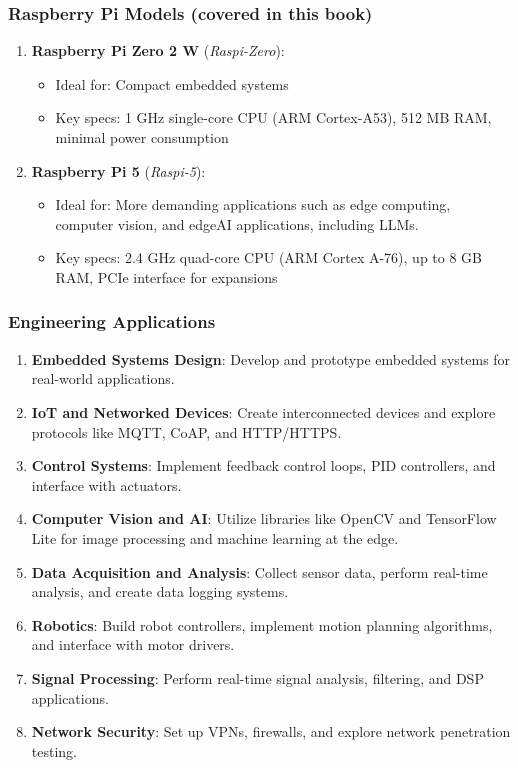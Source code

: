 \documentclass[
]{article}
\providecommand{\tightlist}{%
  \setlength{\itemsep}{0pt}\setlength{\parskip}{0pt}}\usepackage{longtable,booktabs,array}
\begin{document}
\subsubsection{Raspberry Pi Models (covered in this
book)}\label{sec-setup-raspberry-pi-models-covered-book-1942}

\begin{enumerate}
\def\labelenumi{\arabic{enumi}.}
\tightlist
\item
  \textbf{Raspberry Pi Zero 2 W} (\emph{Raspi-Zero}):

  \begin{itemize}
  \tightlist
  \item
    Ideal for: Compact embedded systems
  \item
    Key specs: 1 GHz single-core CPU (ARM Cortex-A53), 512 MB RAM,
    minimal power consumption
  \end{itemize}
\item
  \textbf{Raspberry Pi 5} (\emph{Raspi-5}):

  \begin{itemize}
  \tightlist
  \item
    Ideal for: More demanding applications such as edge computing,
    computer vision, and edgeAI applications, including LLMs.
  \item
    Key specs: 2.4 GHz quad-core CPU (ARM Cortex A-76), up to 8 GB RAM,
    PCIe interface for expansions
  \end{itemize}
\end{enumerate}

\subsubsection{Engineering
Applications}\label{sec-setup-engineering-applications-0b94}

\begin{enumerate}
\def\labelenumi{\arabic{enumi}.}
\item
  \textbf{Embedded Systems Design}: Develop and prototype embedded
  systems for real-world applications.
\item
  \textbf{IoT and Networked Devices}: Create interconnected devices and
  explore protocols like MQTT, CoAP, and HTTP/HTTPS.
\item
  \textbf{Control Systems}: Implement feedback control loops, PID
  controllers, and interface with actuators.
\item
  \textbf{Computer Vision and AI}: Utilize libraries like OpenCV and
  TensorFlow Lite for image processing and machine learning at the edge.
\item
  \textbf{Data Acquisition and Analysis}: Collect sensor data, perform
  real-time analysis, and create data logging systems.
\item
  \textbf{Robotics}: Build robot controllers, implement motion planning
  algorithms, and interface with motor drivers.
\item
  \textbf{Signal Processing}: Perform real-time signal analysis,
  filtering, and DSP applications.
\item
  \textbf{Network Security}: Set up VPNs, firewalls, and explore network
  penetration testing.
\end{enumerate}
\end{document}
